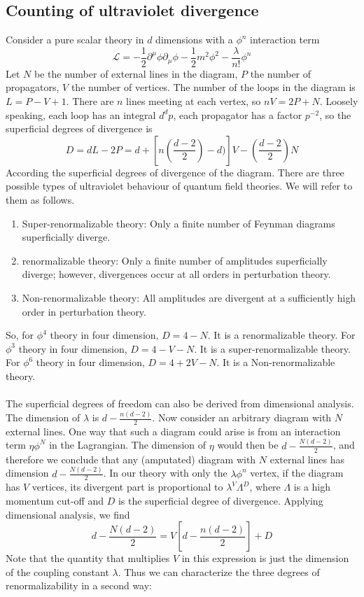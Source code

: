 \subsection{Counting of ultraviolet divergence}
Consider a pure scalar theory in $d$ dimensions with a $\phi^n$ interaction term
\[\mathcal{L} = -\frac{1}{2} \partial^{\mu} \phi \partial_{\mu} \phi -\frac{1}{2}m^2 \phi^2 - \frac{\lambda}{n!}\phi^n\]
Let $N$ be the number of external lines in the diagram, $P$ the number of propagators, $V$ the number of vertices. The number of the loops in the diagram is $L=P-V+1$.  There are $n$ lines meeting at each vertex, so $nV = 2P+N$. Loosely speaking, each loop has an integral $d^d p$, each propagator has a factor $p^{-2}$, so the superficial degrees of divergence is
\[D = dL - 2P = d + [n(\frac{d-2}{2})-d)]V - (\frac{d-2}{2})N\]
According the superficial degrees of divergence of the diagram. There are three possible types of ultraviolet behaviour of quantum field theories. We will refer to them as follows.

\begin{enumerate}
\item Super-renormalizable theory: Only a finite number of Feynman diagrams superficially diverge.
\item renormalizable theory: Only a finite number of amplitudes superficially diverge; however, divergences
occur at all orders in perturbation theory. 
\item Non-renormalizable theory: All amplitudes are divergent at a sufficiently high order in perturbation
theory.
\end{enumerate}
\noindent
So, for $\phi^4$ theory in four dimension, $D = 4 - N$. It is a renormalizable theory. For $\phi^3$ theory in four dimension, $D = 4 - V -N$. It is a super-renormalizable theory. For $\phi^6$ theory in four dimension, $D = 4 + 2V -N$. It is a Non-renormalizable theory. 
\\ \\
The superficial degrees of freedom can also be derived from dimensional analysis. The dimension of $\lambda$ is $d - \frac{n(d-2)}{2}$. Now consider an arbitrary diagram with $N$ external lines. One way that such a diagram could arise is from an interaction term $\eta \phi^N$ in the Lagrangian. The dimension of $\eta$ would then be $d - \frac{N(d-2)}{2}$, and therefore we conclude that any (amputated) diagram with $N$ external lines has dimension $d - \frac{N(d-2)}{2}$. In our theory with only the $\lambda \phi^n$ vertex, if the diagram has $V$ vertices, its divergent part is proportional to $\lambda^V \Lambda^D$, where $\Lambda$ is a high momentum cut-off and $D$ is the superficial degree of divergence.  Applying dimensional analysis, we find
\[d - \frac{N(d-2)}{2} = V[d - \frac{n(d-2)}{2}] + D\]
Note that the quantity that multiplies $V$ in this expression is just the dimension of the coupling constant $\lambda$. Thus we can characterize the three degrees of renormalizability in a second way:


